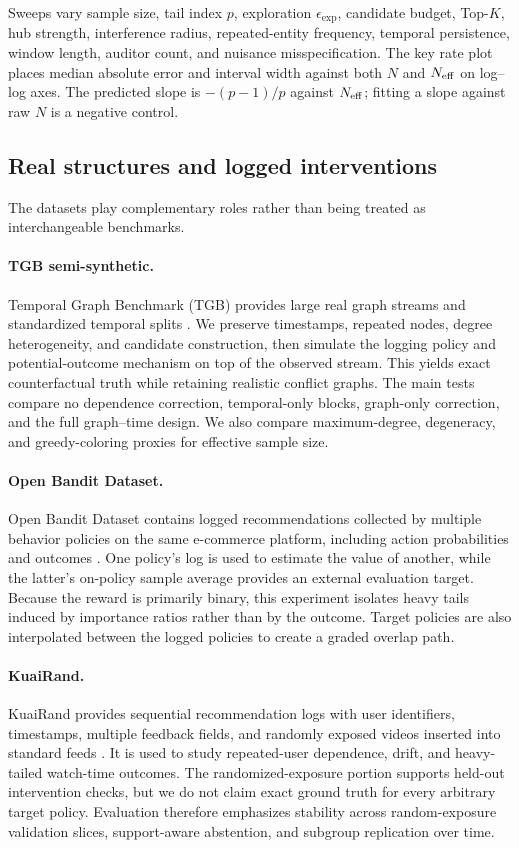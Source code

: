 Sweeps vary sample size, tail index $p$, exploration $\epsilon_{\mathrm{exp}}$, candidate budget, Top-$K$, hub strength, interference radius, repeated-entity frequency, temporal persistence, window length, auditor count, and nuisance misspecification. The key rate plot places median absolute error and interval width against both $N$ and $N_{\mathrm{eff}}$ on log--log axes. The predicted slope is $-(p-1)/p$ against $N_{\mathrm{eff}}$; fitting a slope against raw $N$ is a negative control.

\subsection{Real structures and logged interventions}
The datasets play complementary roles rather than being treated as interchangeable benchmarks.

\paragraph{TGB semi-synthetic.}
Temporal Graph Benchmark (TGB) provides large real graph streams and standardized temporal splits \citep{huang2023tgb}. We preserve timestamps, repeated nodes, degree heterogeneity, and candidate construction, then simulate the logging policy and potential-outcome mechanism on top of the observed stream. This yields exact counterfactual truth while retaining realistic conflict graphs. The main tests compare no dependence correction, temporal-only blocks, graph-only correction, and the full graph--time design. We also compare maximum-degree, degeneracy, and greedy-coloring proxies for effective sample size.

\paragraph{Open Bandit Dataset.}
Open Bandit Dataset contains logged recommendations collected by multiple behavior policies on the same e-commerce platform, including action probabilities and outcomes \citep{saito2021open}. One policy's log is used to estimate the value of another, while the latter's on-policy sample average provides an external evaluation target. Because the reward is primarily binary, this experiment isolates heavy tails induced by importance ratios rather than by the outcome. Target policies are also interpolated between the logged policies to create a graded overlap path.

\paragraph{KuaiRand.}
KuaiRand provides sequential recommendation logs with user identifiers, timestamps, multiple feedback fields, and randomly exposed videos inserted into standard feeds \citep{gao2022kuairand}. It is used to study repeated-user dependence, drift, and heavy-tailed watch-time outcomes. The randomized-exposure portion supports held-out intervention checks, but we do not claim exact ground truth for every arbitrary target policy. Evaluation therefore emphasizes stability across random-exposure validation slices, support-aware abstention, and subgroup replication over time.

